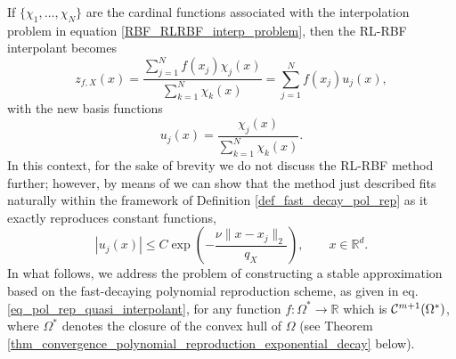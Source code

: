 \documentclass{drna}
\begin{document}
If $\{\chi_1, \dots, \chi_N\}$ are the cardinal functions associated with the interpolation problem in equation \eqref{RBF_RLRBF_interp_problem}, then the RL-RBF interpolant becomes
\begin{equation*}
    z_{f,X}(x)= \frac{\sum_{j=1}^N f(x_j) \chi_j(x)}{\sum_{k=1}^N \chi_k(x)}= \sum_{j=1}^N f(x_j)u_j(x),
\end{equation*}
with the new basis functions
\begin{equation*}
    u_j(x) = \frac{\chi_j(x)}{\sum_{k=1}^N \chi_k(x)}.
\end{equation*}
In this context, for the sake of brevity we do not discuss the RL-RBF method further; however, by means of \cite[Theorem 2.3, Lemma 3.1]{demarchi2020} we can show that the method just described fits naturally within the framework of Definition \ref{def_fast_decay_pol_rep} as it exactly reproduces constant functions,
\begin{equation*}
    |u_j(x)| \leq C \exp\left({-\frac{\nu \| x-x_j\|_2}{q_X}}\right), \qquad x \in \mathbb{R}^d.
\end{equation*}
In what follows, we address the problem of constructing a stable approximation based on the fast-decaying polynomial reproduction scheme, as given in eq. \eqref{eq_pol_rep_quasi_interpolant}, for any function $f: \Omega^* \rightarrow \mathbb{R}$ which is ${\cal C}^{m+1}(\Omega^*)$, where $\Omega^*$ denotes the closure of the convex hull of $\Omega$ (see Theorem \ref{thm_convergence_polynomial_reproduction_exponential_decay} below).
\end{document}
